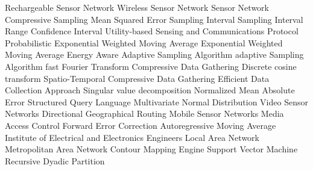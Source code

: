 \begin{acronym}[YTM]
   {Rechargeable Sensor Network}
   {Wireless Sensor Network}
    {Sensor Network}
    {Compressive Sampling}
   {Mean Squared Error}
    {Sampling Interval}
   {Sampling Interval Range}
    {Confidence Interval}
  {Utility-based Sensing and Communications Protocol}
 {Probabilistic Exponential Weighted Moving Average}
  {Exponential Weighted Moving Average}
  {Energy Aware Adaptive Sampling Algorithm}
   {adaptive Sampling Algorithm}
   {fast Fourier Transform}
   {Compressive Data Gathering}
   {Discrete cosine transform}
 {Spatio-Temporal Compressive Data Gathering}
  {Efficient Data Collection Approach}
   {Singular value decomposition}
  {Normalized Mean Absolute Error}
   {Structured Query Language}
   {Multivariate Normal Distribution}
   {Video Sensor Networks}
   {Directional Geographical Routing}
   {Mobile Sensor Networks}
   {Media Access Control}
   {Forward Error Correction}
  {Autoregressive Moving Average}
  {Institute of Electrical and Electronics Engineers}
   {Local Area Network}
   {Metropolitan Area Network}
   {Contour Mapping Engine}
   {Support Vector Machine}
   {Recursive Dyadic Partition}
\end{acronym}